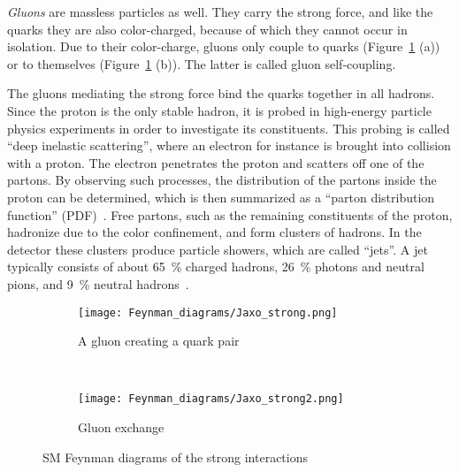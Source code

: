 \noindent\begin{minipage}{0.55\textwidth}
\textit{Gluons} are massless particles as well.
They carry the strong force, and like the quarks they are also color-charged, because of which they cannot occur in isolation.
Due to their color-charge, gluons only couple to quarks (Figure~\ref{fig:Feynman:strong} (a)) or to themselves (Figure~\ref{fig:Feynman:strong} (b)).
The latter is called gluon self-coupling.

The gluons mediating the strong force bind the quarks together in all hadrons.
Since the proton is the only stable hadron, it is probed in high-energy particle physics experiments in order to investigate its constituents.
This probing is called ``deep inelastic scattering'', where an electron for instance is brought into collision with a proton.
The electron penetrates the proton and scatters off one of the partons.
By observing such processes, the distribution of the partons inside the proton can be determined, which is then summarized as a ``parton distribution function'' (PDF)~\cite[p. 134]{PDG}.
Free partons, such as the remaining constituents of the proton, hadronize due to the color confinement, and form clusters of hadrons.
In the detector these clusters produce particle showers, which are called ``jets''.
A jet typically consists of about \SI{65}{\percent} charged hadrons, \SI{26}{\percent} photons and neutral pions, and \SI{9}{\percent} neutral hadrons~\cite[p. 2]{PFA}.
\end{minipage} \hfill
\begin{minipage}{0.4\textwidth}
\centering
\begin{figure}[H]\centering
\begin{subfigure}[b]{\textwidth}\centering
\texttt{[image: Feynman\_diagrams/Jaxo\_strong.png]}
\caption{A gluon creating a quark pair}
\end{subfigure}\\
\begin{subfigure}[b]{\textwidth}\centering
 \texttt{[image: Feynman\_diagrams/Jaxo\_strong2.png]}
\caption{Gluon exchange}
\end{subfigure}
\caption{SM Feynman diagrams of the strong interactions}
\label{fig:Feynman:strong} 
\end{figure}
\end{minipage}

\vspace*{0.3cm}

